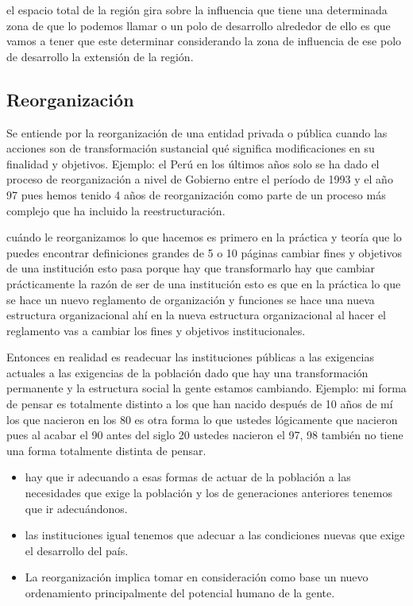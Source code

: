 \documentclass[
  a4paper,
]{article}
\providecommand{\tightlist}{%
  \setlength{\itemsep}{0pt}\setlength{\parskip}{0pt}}\usepackage{longtable,booktabs,array}
\begin{document}
el espacio total de la región gira sobre la influencia que tiene una
determinada zona de que lo podemos llamar o un polo de desarrollo
alrededor de ello es que vamos a tener que este determinar considerando
la zona de influencia de ese polo de desarrollo la extensión de la
región.

\subsection{Reorganización}\label{reorganizaciuxf3n}

Se entiende por la reorganización de una entidad privada o pública
cuando las acciones son de transformación sustancial qué significa
modificaciones en su finalidad y objetivos. Ejemplo: el Perú en los
últimos años solo se ha dado el proceso de reorganización a nivel de
Gobierno entre el período de 1993 y el año 97 pues hemos tenido 4 años
de reorganización como parte de un proceso más complejo que ha incluido
la reestructuración.

cuándo le reorganizamos lo que hacemos es primero en la práctica y
teoría que lo puedes encontrar definiciones grandes de 5 o 10 páginas
cambiar fines y objetivos de una institución esto pasa porque hay que
transformarlo hay que cambiar prácticamente la razón de ser de una
institución esto es que en la práctica lo que se hace un nuevo
reglamento de organización y funciones se hace una nueva estructura
organizacional ahí en la nueva estructura organizacional al hacer el
reglamento vas a cambiar los fines y objetivos institucionales.

Entonces en realidad es readecuar las instituciones públicas a las
exigencias actuales a las exigencias de la población dado que hay una
transformación permanente y la estructura social la gente estamos
cambiando. Ejemplo: mi forma de pensar es totalmente distinto a los que
han nacido después de 10 años de mí los que nacieron en los 80 es otra
forma lo que ustedes lógicamente que nacieron pues al acabar el 90 antes
del siglo 20 ustedes nacieron el 97, 98 también no tiene una forma
totalmente distinta de pensar.

\begin{itemize}
\tightlist
\item
  hay que ir adecuando a esas formas de actuar de la población a las
  necesidades que exige la población y los de generaciones anteriores
  tenemos que ir adecuándonos.
\item
  las instituciones igual tenemos que adecuar a las condiciones nuevas
  que exige el desarrollo del país.
\item
  La reorganización implica tomar en consideración como base un nuevo
  ordenamiento principalmente del potencial humano de la gente.
\end{itemize}
\end{document}
